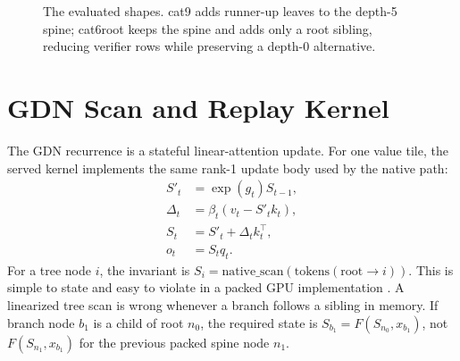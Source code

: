 \documentclass[conference]{IEEEtran}
\begin{document}
\begin{figure}[t]
\centering
{}
\caption{The evaluated shapes. cat9 adds runner-up leaves to the depth-5 spine; cat6root keeps the spine and adds only a root sibling, reducing verifier rows while preserving a depth-0 alternative.}
\label{fig:shapes}
\end{figure}

\section{GDN Scan and Replay Kernel}

The GDN recurrence is a stateful linear-attention update. For one value tile, the served kernel implements the same rank-1 update body used by the native path:
\begin{align}
S'_t &= \exp(g_t) S_{t-1}, \\
\Delta_t &= \beta_t \left(v_t - S'_t k_t\right), \\
S_t &= S'_t + \Delta_t k_t^\top, \\
o_t &= S_t q_t.
\end{align}
For a tree node \(i\), the invariant is \(S_i = \mathrm{native\_scan}(\mathrm{tokens}(\mathrm{root}\rightarrow i))\). This is simple to state and easy to violate in a packed GPU implementation \cite{yang2024gated}. A linearized tree scan is wrong whenever a branch follows a sibling in memory. If branch node \(b_1\) is a child of root \(n_0\), the required state is \(S_{b_1}=F(S_{n_0},x_{b_1})\), not \(F(S_{n_1},x_{b_1})\) for the previous packed spine node \(n_1\).
\end{document}
